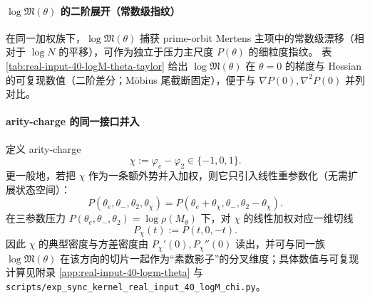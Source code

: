 \paragraph{\texorpdfstring{$\log\mathfrak{M}(\theta)$}{logM(theta)} 的二阶展开（常数级指纹）}
在同一加权族下，$\log\mathfrak{M}(\theta)$ 捕获 prime-orbit Mertens 主项中的常数级漂移（相对于 $\log N$ 的平移），可作为独立于压力主尺度 $P(\theta)$ 的细粒度指纹。
表 \ref{tab:real-input-40-logM-theta-taylor} 给出 $\log\mathfrak{M}(\theta)$ 在 $\theta=0$ 的梯度与 Hessian 的可复现数值（二阶差分；Möbius 尾截断固定），便于与 $\nabla P(0),\nabla^2P(0)$ 并列对比。


\paragraph{arity-charge 的同一接口并入}
定义 arity-charge
\[
\chi:=\varphi_e-\varphi_2\in\{-1,0,1\}.
\]
更一般地，若把 $\chi$ 作为一条额外势并入加权，则它只引入线性重参数化（无需扩展状态空间）：
\[
P(\theta_e,\theta_-,\theta_2,\theta_\chi)=P(\theta_e+\theta_\chi,\theta_-,\theta_2-\theta_\chi).
\]
在三参数压力 $P(\theta_e,\theta_-,\theta_2)=\log\rho(M_\theta)$ 下，对 $\chi$ 的线性加权对应一维切线
\[
P_\chi(t):=P(t,0,-t).
\]
因此 $\chi$ 的典型密度与方差密度由
\(
P_\chi'(0),P_\chi''(0)
\)
读出，并可与同一族 $\log\mathfrak{M}(\theta)$ 在该方向的切片一起作为“素数影子”的分叉维度；具体数值与可复现计算见附录 \ref{app:real-input-40-logm-theta} 与
\texttt{scripts/exp\_sync\_kernel\_real\_input\_40\_logM\_chi.py}。

